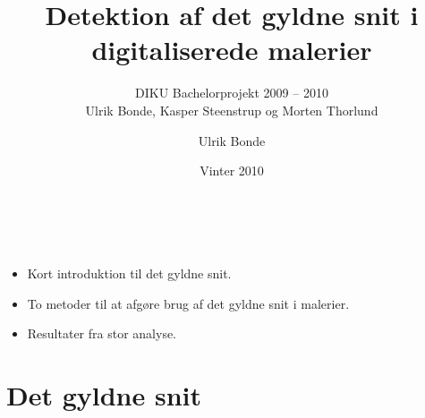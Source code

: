 \documentclass[xcolor=table]{beamer}
\title{\huge{Detektion af det gyldne snit i digitaliserede malerier}}
\subtitle{DIKU Bachelorprojekt 2009 -- 2010\\{\tiny Ulrik Bonde, Kasper Steenstrup og Morten Thorlund}}
\author{Ulrik Bonde}
\date{Vinter 2010}
\begin{document}
\begin{frame}
    \titlepage
\end{frame}

\section[Oversigt]{}
\begin{frame}

    \frametitle{\ }

    \begin{itemize}
        \item Kort introduktion til det gyldne snit.
        \item To metoder til at afgøre brug af det gyldne snit i malerier.
        \item Resultater fra stor analyse.
    \end{itemize}

\end{frame}

\section{Det gyldne snit}
\subsection*{}
\end{document}
